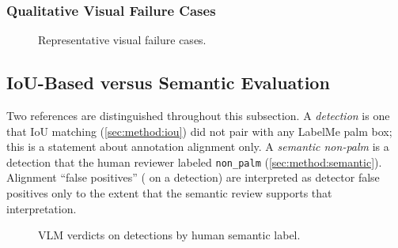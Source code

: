 \subsubsection{Qualitative Visual Failure Cases}
\label{sec:results:failures:visual}
\begin{figure}[t]
  \centering
  \caption{Representative visual failure cases. }
  \label{fig:visual_failures}
\end{figure}

\subsection{IoU-Based versus Semantic Evaluation}
\label{sec:results:iou_vs_semantic}

Two references are distinguished throughout this subsection. A
\emph{\unmatched{} detection} is one that IoU matching
(\cref{sec:method:iou}) did not pair with any LabelMe palm box; this is a
statement about annotation alignment only. A \emph{semantic non-palm} is a
detection that the human reviewer labeled \texttt{non\_palm}
(\cref{sec:method:semantic}). Alignment ``false positives'' (\R{} on a
\unmatched{} detection) are interpreted as detector false positives only to the
extent that the semantic review supports that interpretation.







\begin{figure}[t]
  \centering
  \caption{VLM verdicts on \unmatched{} detections by human semantic label. }
  \label{fig:semantic_comparison}
\end{figure}

